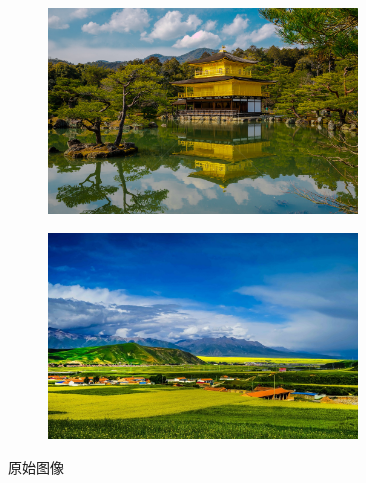 \documentclass[12pt]{article}
\begin{document}
		\begin{figure}[htbp]
			\centering
			\begin{subfigure}{0.36\linewidth}
				\centering
				\includegraphics[width=0.9\textwidth]{figure/pic1_source.jpg}
			\end{subfigure}
			\begin{subfigure}{0.36\linewidth}
				\centering
				\includegraphics[width=0.9\textwidth]{figure/pic2_source.jpg}
			\end{subfigure}
			\caption{原始图像}
		\end{figure}
\end{document}
